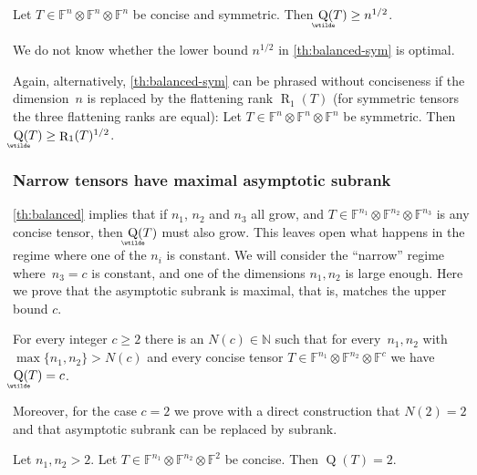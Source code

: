 \documentclass{daj}
\DeclareMathOperator{\subrank}{Q}
\DeclareMathOperator{\asympsubrank}{\underaccent{\wtilde}{Q}}
\DeclareMathOperator{\tensorrank}{R}
\newcommand{\FF}{\mathbb{F}}
\newcommand{\NN}{\mathbb{N}}
\begin{document}

\begin{theorem}\label{th:balanced-sym}
Let $T \in \FF^{n} \otimes \FF^{n} \otimes \FF^{n}$ be concise and symmetric. Then $\asympsubrank(T) \geq n^{1/2}$.
\end{theorem}

We do not know whether the lower bound $n^{1/2}$ in \autoref{th:balanced-sym} is optimal.

Again, alternatively, \autoref{th:balanced-sym} can be phrased without conciseness if the dimension~$n$ is replaced by the flattening rank $\tensorrank_1(T)$ (for symmetric tensors the three flattening ranks are equal): Let $T \in \FF^n \otimes \FF^n \otimes \FF^n$ be symmetric. Then $\asympsubrank(T)\geq \tensorrank_1(T)^{1/2}$.


%
%
%

\subsubsection{Narrow tensors have maximal asymptotic subrank}

\autoref{th:balanced} implies that if $n_1$, $n_2$ and $n_3$ all grow, and $T \in \FF^{n_1} \otimes \FF^{n_2} \otimes \FF^{n_3}$ is any concise tensor, then $\asympsubrank(T)$ must also grow. This leaves open what happens in the regime where one of the $n_i$ is constant. We will consider the ``narrow'' regime where~$n_3=c$ is constant, and one of the dimensions $n_1, n_2$ is large enough. Here we prove that the asymptotic subrank is maximal, that is, matches the upper bound $c$.

\begin{theorem}\label{th:narrow-intro}
For every integer $c \geq 2$ there is an $N(c) \in \NN$ such that for every~$n_1, n_2$ with $\max\{n_1, n_2\} > N(c)$ and every concise tensor $T \in \FF^{n_1} \otimes \FF^{n_2} \otimes \FF^c$ we have $\asympsubrank(T) = c$.
\end{theorem}

Moreover, for the case $c = 2$ we prove with a direct construction that $N(2) = 2$ and that asymptotic subrank can be replaced by subrank.

\begin{theorem}
Let $n_1,n_2 > 2$. Let $T \in \FF^{n_1} \otimes \FF^{n_2} \otimes \FF^2$ be concise. Then $\subrank(T) = 2$.
\end{theorem}
\end{document}
